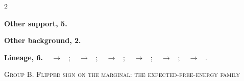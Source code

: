 \documentclass[10pt]{article}
\newcommand{\memb}[1]{\par\smallskip\textbf{#1}\quad}
\begin{document}
\begin{multicols}{2}
\memb{Other support, 5.} \citetext{\citealp{Friston-reinforcement09}; \citealp{Friston-action10}; \citealp{Baltieri-pid19}; \citealp{Baltieri-kalman20}; \citealp{Baltieri-predictions20}}

\memb{Other background, 2.} {\footnotesize \citetext{\citealp{Ororbia-mortal23}; \citealp{Hill-structural25}}}

\end{multicols}
\memb{Lineage, 6.} {\footnotesize \citeauthor{Friston-free06}~\citeyear{Friston-free06} $\to$ \citeauthor{Friston-reinforcement09}~\citeyear{Friston-reinforcement09}; \citeauthor{Friston-free06}~\citeyear{Friston-free06} $\to$ \citeauthor{Friston-action10}~\citeyear{Friston-action10}; \citeauthor{Friston-action10}~\citeyear{Friston-action10} $\to$ \citeauthor{Baltieri-pid19}~\citeyear{Baltieri-pid19}; \citeauthor{Pezzulo-active15}~\citeyear{Pezzulo-active15} $\to$ \citeauthor{Tschantz-simulating22}~\citeyear{Tschantz-simulating22}; \citeauthor{Baltieri-pid19}~\citeyear{Baltieri-pid19} $\to$ \citeauthor{Baltieri-predictions20}~\citeyear{Baltieri-predictions20}; \citeauthor{Millidge-whence21}~\citeyear{Millidge-whence21} $\to$ \citeauthor{Idei-future24}~\citeyear{Idei-future24}.}

\medskip\textsc{Group B. Flipped sign on the marginal: the expected-free-energy family}
\end{document}

